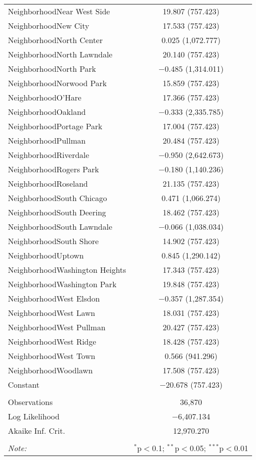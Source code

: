 \documentclass{report}
\begin{document}
\begin{table}[!htbp]
\begin{tabular}{@{\extracolsep{5pt}}lc}
 NeighborhoodNear West Side & 19.807 (757.423) \\ 
 NeighborhoodNew City & 17.533 (757.423) \\ 
 NeighborhoodNorth Center & 0.025 (1,072.777) \\ 
 NeighborhoodNorth Lawndale & 20.140 (757.423) \\ 
 NeighborhoodNorth Park & $-$0.485 (1,314.011) \\ 
 NeighborhoodNorwood Park & 15.859 (757.423) \\ 
 NeighborhoodO'Hare & 17.366 (757.423) \\ 
 NeighborhoodOakland & $-$0.333 (2,335.785) \\ 
 NeighborhoodPortage Park & 17.004 (757.423) \\ 
 NeighborhoodPullman & 20.484 (757.423) \\ 
 NeighborhoodRiverdale & $-$0.950 (2,642.673) \\ 
 NeighborhoodRogers Park & $-$0.180 (1,140.236) \\ 
 NeighborhoodRoseland & 21.135 (757.423) \\ 
 NeighborhoodSouth Chicago & 0.471 (1,066.274) \\ 
 NeighborhoodSouth Deering & 18.462 (757.423) \\ 
 NeighborhoodSouth Lawndale & $-$0.066 (1,038.034) \\ 
 NeighborhoodSouth Shore & 14.902 (757.423) \\ 
 NeighborhoodUptown & 0.845 (1,290.142) \\ 
 NeighborhoodWashington Heights & 17.343 (757.423) \\ 
 NeighborhoodWashington Park & 19.848 (757.423) \\ 
 NeighborhoodWest Elsdon & $-$0.357 (1,287.354) \\ 
 NeighborhoodWest Lawn & 18.031 (757.423) \\ 
 NeighborhoodWest Pullman & 20.427 (757.423) \\ 
 NeighborhoodWest Ridge & 18.428 (757.423) \\ 
 NeighborhoodWest Town & 0.566 (941.296) \\ 
 NeighborhoodWoodlawn & 17.508 (757.423) \\ 
 Constant & $-$20.678 (757.423) \\ 
\hline \\[-1.8ex] 
Observations & 36,870 \\ 
Log Likelihood & $-$6,407.134 \\ 
Akaike Inf. Crit. & 12,970.270 \\ 
\hline 
\hline \\[-1.8ex] 
\textit{Note:}  & \multicolumn{1}{r}{$^{*}$p$<$0.1; $^{**}$p$<$0.05; $^{***}$p$<$0.01} \\ 
\end{tabular} 
\end{table} 
\end{document}
